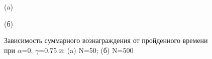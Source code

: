 \documentclass[a4paper]{report}
\theoremstyle{definition}
\theoremstyle{plain}
\theoremstyle{remark}
\theoremstyle{remark}
\theoremstyle{definition}
\begin{document}
\begin{figure}[H]
    \begin{minipage}[H]{0.49\linewidth}
        (a)\\
    \end{minipage}
    \hfill
    \begin{minipage}[H]{0.49\linewidth}
        (б)\\
    \end{minipage}
    \caption{Зависимость суммарного вознаграждения от пройденного времени при $\alpha$=0, $\gamma$=0.75 и: (a) N=50; (б) N=500}
\end{figure}
\end{document}

